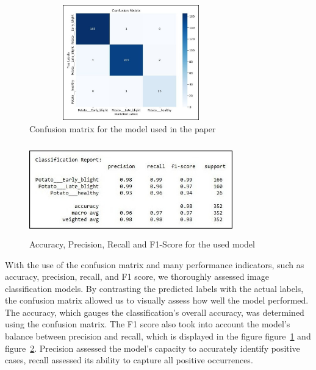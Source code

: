 \documentclass[conference]{IEEEtran}
\begin{document}
 \begin{figure}[H]
 \includegraphics[width=8.8cm, height=5cm]{Potato Confusion Matrix.jpg}
\caption{Confusion matrix for the model used in the paper}
\label{fig: Figure 4}
\end{figure}

 \begin{figure}[H]
 \includegraphics[width=8.8cm, height=4cm]{Potato Stats.jpg}
\caption{Accuracy, Precision, Recall and F1-Score for the used model}
\label{fig: Figure 5}
\end{figure}

With the use of the confusion matrix and many performance indicators, such as accuracy, precision, recall, and F1 score, we thoroughly assessed image classification models. By contrasting the predicted labels with the actual labels, the confusion matrix allowed us to visually assess how well the model performed. The accuracy, which gauges the classification's overall accuracy, was determined using the confusion matrix. The F1 score also took into account the model's balance between precision and recall, which is displayed in the figure figure~\ref{fig: Figure 4} and figure~\ref{fig: Figure 5}. Precision assessed the model's capacity to accurately identify positive cases, recall assessed its ability to capture all positive occurrences.
  
\end{document}
